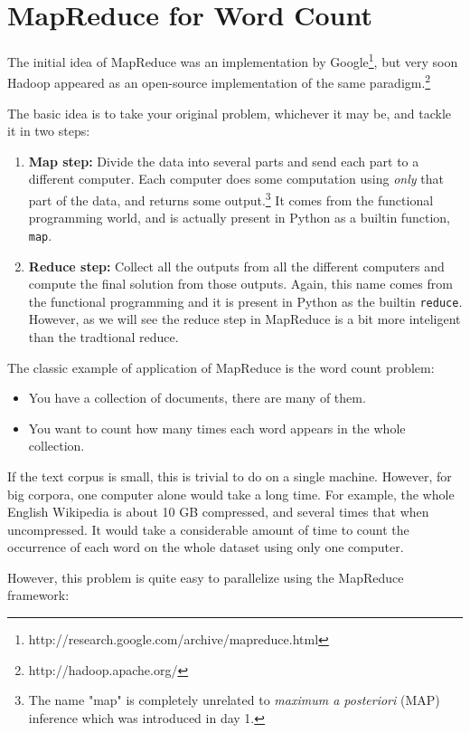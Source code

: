 \section{MapReduce for Word Count}

The initial idea of MapReduce was an implementation by
Google\footnote{http://research.google.com/archive/mapreduce.html}, but very
soon Hadoop appeared as an open-source implementation of the same
paradigm.\footnote{http://hadoop.apache.org/}

The basic idea is to take your original problem, whichever it may be, and tackle it in two steps:
%
\begin{enumerate}
\item \textbf{Map step:} Divide the data into several parts and send each part
to a different computer. Each computer does some computation using \emph{only}
that part of the data, and returns some output.\footnote{The name "map" is completely
unrelated to \emph{maximum a posteriori} (MAP) inference which was introduced
in day 1.} It comes from the functional programming world, and is actually
present in Python as a builtin function, \verb+map+.
\item \textbf{Reduce step:} Collect all the outputs from all the different
computers and compute the final solution from those outputs. Again, this name
comes from the functional programming and it is present in Python as the builtin
\verb+reduce+. However, as we will see the reduce step in MapReduce is a bit
more inteligent than the tradtional reduce.
\end{enumerate}

The classic example of application of MapReduce is the word count problem:

\begin{itemize}
\item You have a collection of documents, there are many of them.
\item You want to count how many times each word appears in the whole collection.
\end{itemize}

If the text corpus is small, this is trivial to do on a single machine. However, for big corpora, one computer alone would take a long time. For example, the whole English Wikipedia is about 10 GB compressed, and several times that when uncompressed. It would take a considerable amount of time to count the occurrence of each word on the whole dataset using only one computer.

However, this problem is quite easy to parallelize using the MapReduce framework:

